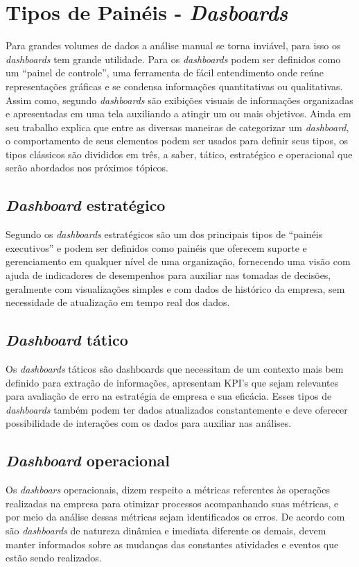 \documentclass[
	12pt,				%
	openright,			%
	oneside,			%
	a4paper,			%
	english,			%
	brazil				%
	]{abntex2}
\begin{document}
\section{Tipos de Painéis - \textit{Dasboards}}
Para grandes volumes de dados a análise manual se torna inviável, para isso os \textit{dashboards} tem grande utilidade. Para \cite{hansoti2010business} os \textit{dashboards} podem ser definidos como um ``painel de controle'', uma ferramenta de fácil entendimento onde reúne representações gráficas e se condensa informações quantitativas ou qualitativas. Assim como, segundo \cite{few2003information} \textit{dashboards} são exibições visuais de informações organizadas e apresentadas em uma tela auxiliando a atingir um ou mais objetivos. 
Ainda em seu trabalho \cite{few2003information} explica que entre as diversas maneiras de categorizar um \textit{dashboard}, o comportamento de seus elementos podem ser usados para definir seus tipos, os tipos clássicos são divididos em três, a saber, tático, estratégico e operacional que serão abordados nos próximos tópicos.


\subsection{\textit{Dashboard} estratégico}
 Segundo \cite{few2003information} os \textit{dashboards} estratégicos são um dos principais tipos de ``painéis executivos'' e podem ser definidos como painéis que oferecem suporte e gerenciamento em qualquer nível de uma organização, fornecendo uma visão com ajuda de indicadores de desempenhos para auxiliar nas tomadas de decisões, geralmente com visualizações simples e com dados de histórico da empresa, sem necessidade de atualização em tempo real dos dados.

\subsection{\textit{Dashboard} tático}
Os \textit{dashboards} táticos são dashboards que necessitam de um contexto mais bem definido para extração de informações, apresentam KPI's que sejam relevantes para avaliação de erro na estratégia de empresa e sua eficácia. Esses tipos de \textit{dashboards} também podem ter dados atualizados constantemente e deve oferecer possibilidade de interações com os dados para auxiliar nas análises.

\subsection{\textit{Dashboard} operacional}
Os \textit{dashboars} operacionais, dizem respeito a métricas referentes às operações realizadas na empresa para otimizar processos acompanhando suas métricas, e por meio da análise dessas métricas sejam identificados os erros. De acordo com \cite{few2009now} são  \textit{dashboards} de natureza dinâmica e imediata diferente os demais, devem manter informados sobre as mudanças das constantes atividades e eventos que estão sendo realizados.
\end{document}
